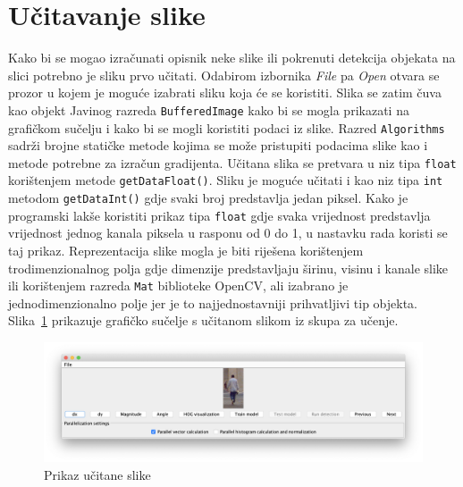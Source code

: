 \documentclass[times, utf8, zavrsni]{fer}
\begin{document}
\section{Učitavanje slike}
Kako bi se mogao izračunati opisnik neke slike ili pokrenuti detekcija objekata na slici potrebno je sliku prvo učitati. Odabirom izbornika \textit{File} pa \textit{Open} otvara se prozor u kojem je moguće izabrati sliku koja će se koristiti. Slika se zatim čuva kao objekt Javinog razreda \verb|BufferedImage| kako bi se mogla prikazati na grafičkom sučelju i kako bi se mogli koristiti podaci iz slike. Razred \verb|Algorithms| sadrži brojne statičke metode kojima se može pristupiti podacima slike kao i metode potrebne za izračun gradijenta. Učitana slika se pretvara u niz tipa \verb|float| korištenjem metode \verb|getDataFloat()|. Sliku je moguće učitati i kao niz tipa \verb|int| metodom \verb|getDataInt()| gdje svaki broj predstavlja jedan piksel. Kako je programski lakše koristiti prikaz tipa \verb|float| gdje svaka vrijednost predstavlja vrijednost jednog kanala piksela u rasponu od 0 do 1, u nastavku rada koristi se taj prikaz. Reprezentacija slike mogla je biti riješena korištenjem trodimenzionalnog polja gdje dimenzije predstavljaju širinu, visinu i kanale slike ili korištenjem razreda \verb|Mat| biblioteke OpenCV, ali izabrano je jednodimenzionalno polje jer je to najjednostavniji prihvatljivi tip objekta. Slika~\ref{fig:loadedImage} prikazuje grafičko sučelje s učitanom slikom iz skupa za učenje.

\begin{figure}[htb]
	\centering
	\includegraphics[width=\linewidth]{figures/loadedImage.png}
	\caption{Prikaz učitane slike}
	\label{fig:loadedImage}
\end{figure}
\end{document}
